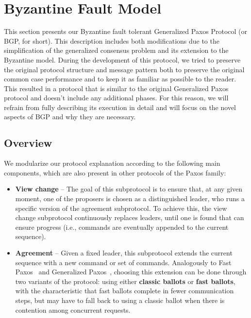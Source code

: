 \section{Byzantine Fault Model} \label{Byzatine Fault Model}
This section presents our Byzantine fault tolerant Generalized Paxos
Protocol (or BGP, for short). This description includes both modifications due to the simplification of the generalized consensus problem and its extension to the Byzantine model. During the development of this protocol, we tried to preserve the original protocol structure and message pattern both to preserve the original common case performance and to keep it as familiar as possible to the reader. This resulted in a protocol that is similar to the original Generalized Paxos protocol and doesn't include any additional phases. For this reason, we will refrain from fully describing its execution in detail and will focus on the novel aspects of BGP and why they are  necessary.

\subsection{Overview}

We modularize our protocol explanation according to the following main components, which are also present in other protocols of the Paxos family:

\begin{itemize}
	
	\item
	{\bf View change} -- The goal of this subprotocol is to ensure that, at any given moment, one of the proposers is chosen as a distinguished leader, who runs a specific version of the agreement subprotocol. To achieve this, the view change subprotocol continuously replaces leaders, until one is found that can ensure progress (i.e., commands are eventually appended to the current sequence).
	
	\item
	{\bf Agreement} -- Given a fixed leader, this subprotocol extends the current sequence with a new command or set of commands. Analogously to Fast Paxos~\cite{L06} and Generalized Paxos~\cite{Lamport2005}, choosing this extension can be done through two variants of the protocol: using either {\bf classic ballots} or {\bf fast ballots}, with the characteristic that fast ballots complete in fewer communication steps, but may have to fall back to using a classic ballot when there is contention among concurrent requests.
	
\end{itemize}

